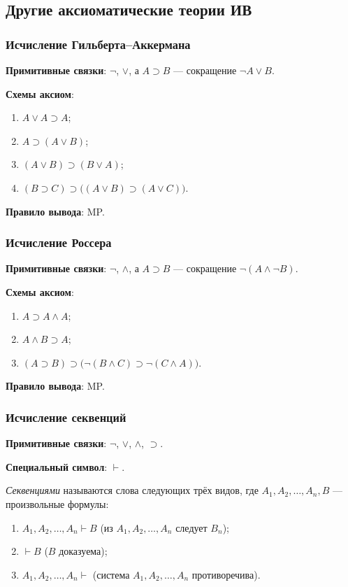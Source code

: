 \subsection{Другие аксиоматические теории ИВ}
\subsubsection{Исчисление Гильберта--Аккермана}

\textbf{Примитивные связки}: $\neg$, $\lor$, а $A \supset B$ --- сокращение $\neg A \lor B$.

\textbf{Схемы аксиом}:
\begin{enumerate}[label=(А\arabic*)]
    \item $A \lor A \supset A$;
    \item $A \supset (A \lor B)$;
    \item $(A \lor B) \supset (B \lor A)$;
    \item $(B \supset C) \supset \big((A \lor B) \supset (A \lor C)\big)$.
\end{enumerate}

\textbf{Правило вывода}: MP.

\subsubsection{Исчисление Россера}
\textbf{Примитивные связки}: $\neg$, $\land$, а $A \supset B$ --- сокращение $\neg(A \land \neg B)$.

\textbf{Схемы аксиом}:
\begin{enumerate}[label=(А\arabic*)]
    \item $A \supset A \land A$;
    \item $A \land B \supset A$;
    \item $(A \supset B) \supset \big(\neg(B \land C) \supset \neg(C \land A)\big)$.
\end{enumerate}

\textbf{Правило вывода}: MP.

\subsubsection{Исчисление секвенций}
\textbf{Примитивные связки}: $\neg$, $\lor$, $\land$, $\supset$.

\textbf{Специальный символ}: $\vdash$.

\textit{Секвенциями} называются слова следующих трёх видов, где $A_1, A_2, \dots, A_n, B$ --- произвольные формулы:
\begin{enumerate}
    \item $A_1, A_2, \dots, A_n \vdash B$ (из $A_1, A_2, \dots, A_n$ следует $B_n$);
    \item $\vdash B$ ($B$ доказуема);
    \item $A_1, A_2, \dots, A_n \vdash$ (система $A_1, A_2, \dots, A_n$ противоречива).
\end{enumerate}

